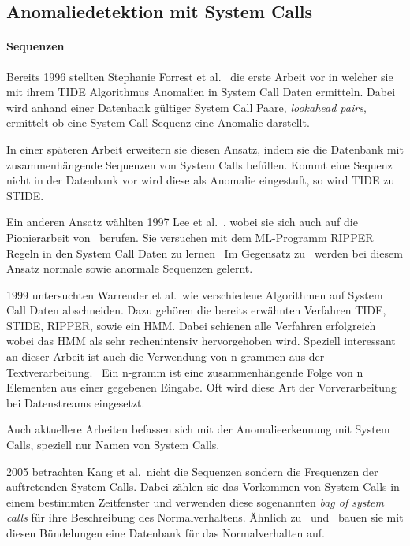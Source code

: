     \subsection{Anomaliedetektion mit System Calls}

    \paragraph{Sequenzen}
        Bereits 1996 stellten Stephanie Forrest et al.~\cite{FORREST} die erste Arbeit vor in welcher sie mit ihrem \ac{TIDE} Algorithmus Anomalien in System Call Daten ermitteln.
        Dabei wird anhand einer Datenbank gültiger System Call Paare, \textit{lookahead pairs}, ermittelt ob eine System Call Sequenz eine Anomalie darstellt.

        In einer späteren Arbeit erweitern sie diesen Ansatz, indem sie die Datenbank mit zusammenhängende Sequenzen von System Calls befüllen.
        Kommt eine Sequenz nicht in der Datenbank vor wird diese als Anomalie eingestuft, so wird \ac{TIDE} zu \ac{STIDE}.~\cite{STIDE}

        Ein anderen Ansatz wählten 1997 Lee et al.~\cite{LEE1997}, wobei sie sich auch auf die Pionierarbeit von~\cite{FORREST} berufen.
        Sie versuchen mit dem \ac{ML}-Programm \ac{RIPPER} Regeln in den System Call Daten zu lernen~\cite{LEE1997}
        Im Gegensatz zu~\cite{FORREST} werden bei diesem Ansatz normale sowie anormale Sequenzen gelernt.

        1999 untersuchten Warrender et al.\ wie verschiedene Algorithmen auf System Call Daten abschneiden.
        Dazu gehören die bereits erwähnten Verfahren \ac{TIDE}, \ac{STIDE}, \ac{RIPPER}, sowie ein \ac{HMM}.
        Dabei schienen alle Verfahren erfolgreich wobei das \ac{HMM} als sehr rechenintensiv hervorgehoben wird.
        Speziell interessant an dieser Arbeit ist auch die Verwendung von n-grammen aus der Textverarbeitung.~\cite{STIDE_Alternatives}
        Ein n-gramm ist eine zusammenhängende Folge von n Elementen aus einer gegebenen Eingabe.
        Oft wird diese Art der Vorverarbeitung bei Datenstreams eingesetzt.
 
        Auch aktuellere Arbeiten befassen sich mit der Anomalieerkennung mit System Calls, {\color{red} speziell nur Namen von System Calls}.
    
        2005 betrachten Kang et al.\ nicht die Sequenzen sondern die Frequenzen der auftretenden System Calls.
        Dabei zählen sie das Vorkommen von System Calls in einem bestimmten Zeitfenster und verwenden diese sogenannten \textit{bag of system calls} für ihre Beschreibung des Normalverhaltens.
        Ähnlich zu~\cite{FORREST} und~\cite{STIDE} bauen sie mit diesen Bündelungen eine Datenbank für das Normalverhalten auf.~\cite{FREQUENCY2}

